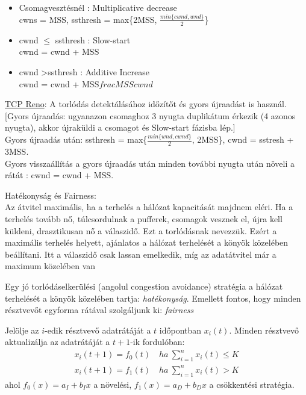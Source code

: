 \documentclass[margin=0px]{article}
\begin{document}
\begin{description}
\begin{itemize}
\begin{itemize}
                      \item Csomagvesztésnél : Multiplicative decrease \\
                            cwns = MSS, ssthresh = 	max\{2MSS, $\frac{min\{cwnd, wnd\}}{2}$\}
                      \item cwnd $\leq $ ssthresh : Slow-start \\
                            cwnd = cwnd + MSS
                      \item cwnd \textgreater ssthresh : Additive Increase \\
                            cwnd = 	cwnd + MSS$frac{MSS}{cwnd}$
                  \end{itemize}
                  \underline{TCP Reno}: A torlódás detektálásához időzítőt és gyors újraadást is használ. [Gyors újraadás: ugyanazon csomaghoz 3 nyugta duplikátum érkezik (4 azonos nyugta), akkor újraküldi a csomagot és Slow-start fázisba lép.] \\
                  Gyors újraadás után: ssthresh = max\{$\frac{min\{wnd,cwnd\}}{2}$, 2MSS\}, cwnd = sstresh + 3MSS. \\
                  Gyors visszaállítás a gyors újraadás után minden további nyugta után növeli a rátát : cwnd = cwnd + MSS.
        \end{itemize}

        Hatékonyság és Fairness: \\
        Az átvitel maximális, ha a terhelés a hálózat kapacitását majdnem eléri. Ha a terhelés tovább nő, túlcsordulnak a pufferek, csomagok vesznek el, újra kell küldeni, drasztikusan nő a válaszidő. Ezt a torlódásnak nevezzük. Ezért a maximális terhelés helyett, ajánlatos a hálózat terhelését a könyök közelében beállítani. Itt a válaszidő csak lassan emelkedik, míg az adatátvitel már a maximum közelében van

        Egy jó torlódáselkerülési (angolul congestion avoidance) stratégia a hálózat terhelését a könyök közelében tartja: \textit{hatékonyság}. Emellett fontos, hogy minden résztvevőt egyforma rátával szolgáljunk ki: \textit{fairness}

        Jelölje az $i$-edik résztvevő adatrátáját a $t$ időpontban $x_i(t)$.
        Minden résztvevő aktualizálja az adatrátáját a $t+1$-ik fordulóban:
        \begin{align*}
            x_i(t+1) = f_0(t) \quad  ha \ \sum_{i=1}^{n}x_i(t) \leq K \\
            x_i(t+1) = f_1(t) \quad  ha \ \sum_{i=1}^{n}x_i(t) > K
        \end{align*}
        ahol $f_0(x) = a_I + b_Ix$ a növelési, $f_1(x) = a_D + b_Dx$ a csökkentési stratégia.


\end{description}
\end{document}

